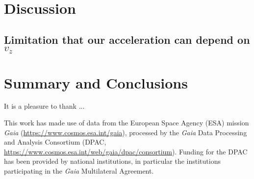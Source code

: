 \section{Discussion} \label{sec:discussion}

\subsection{Limitation that our acceleration can depend on $v_z$}


\section{Summary and Conclusions} \label{sec:conclusions}


\begin{acknowledgements}

It is a pleasure to thank ...



This work has made use of data from the European Space Agency (ESA) mission
{\it Gaia} (\url{https://www.cosmos.esa.int/gaia}), processed by the {\it Gaia}
Data Processing and Analysis Consortium (DPAC,
\url{https://www.cosmos.esa.int/web/gaia/dpac/consortium}). Funding for the DPAC
has been provided by national institutions, in particular the institutions
participating in the {\it Gaia} Multilateral Agreement.

\end{acknowledgements}

